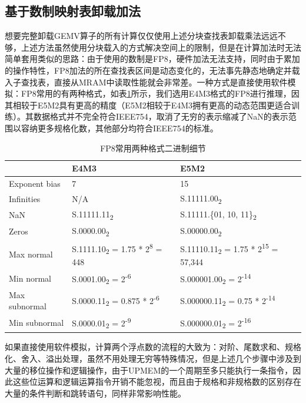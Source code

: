 \subsection{基于数制映射表卸载加法}
想要完整卸载GEMV算子的所有计算仅仅使用上述分块查找表卸载乘法远远不够，上述方法虽然使用分块载入的方式解决空间上的限制，但是在计算加法时无法简单套用类似的思路：由于使用的数制是FP8，硬件加法无法支持，同时由于累加的操作特性，FP8加法的所在查找表区间是动态变化的，无法事先静态地确定并载入子查找表，直接从MRAM中读取性能就会非常差。一种方式是直接使用软件模拟：FP8常用的有两种格式\cite{FP8}，如表\ref{FP8Format}所示，我们选用E4M3格式的FP8进行推理，因其相较于E5M2具有更高的精度（E5M2相较于E4M3拥有更高的动态范围更适合训练）。其数据格式并不完全符合IEEE754，取消了无穷的表示缩减了NaN的表示范围以容纳更多规格化数，其他部分均符合IEEE754的标准。
    
\begin{table}[!htbp]
    \caption{FP8常用两种格式二进制细节}
    \label{FP8Format}
    \begin{tabular}{lll}
        \toprule
        & E4M3 & E5M2 \\ 
        \midrule
        Exponent bias & 7 & 15 \\
        Infinities & N/A & S.11111.00\textsubscript{2} \\
        NaN & S.11111.11\textsubscript{2} & S.11111.\{01, 10, 11\}\textsubscript{2} \\
        Zeros & S.0000.00\textsubscript{2} & S.00000.00\textsubscript{2} \\
        Max normal & S.1111.10\textsubscript{2} = 1.75 * 2\textsuperscript{8} = 448 & S.11110.11\textsubscript{2} = 1.75 * 2\textsuperscript{15} = 57,344 \\
        Min normal & S.0001.00\textsubscript{2} = 2\textsuperscript{-6} & S.000001.00\textsubscript{2} = 2\textsuperscript{-14} \\
        Max subnormal & S.0000.11\textsubscript{2} = 0.875 * 2\textsuperscript{-6} & S.000000.11\textsubscript{2} = 0.75 * 2\textsuperscript{-14} \\
        Min subnormal & S.0000.01\textsubscript{2} = 2\textsuperscript{-9} & S.000000.01\textsubscript{2} = 2\textsuperscript{-16} \\ 
        \bottomrule
    \end{tabular}
\end{table}

如果直接使用软件模拟，计算两个浮点数的流程的大致为：对阶、尾数求和、规格化、舍入、溢出处理，虽然不用处理无穷等特殊情况，但是上述几个步骤中涉及到大量的移位操作和逻辑操作，由于UPMEM的一个周期至多只能执行一条指令\cite{UPMEMHotChips}，因此这些位运算和逻辑运算指令开销不能忽视，而且由于规格和非规格数的区别存在大量的条件判断和跳转语句，同样非常影响性能。

